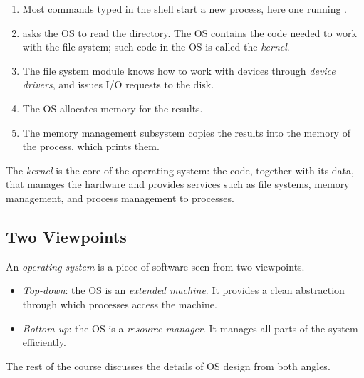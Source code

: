 \begin{enumerate}
  \item Most commands typed in the shell start a new process, here one running .
  \item {} asks the OS to read the directory. The OS contains the code needed to work with the file system; such code in the OS is called the \emph{kernel}.
  \item The file system module knows how to work with devices through \emph{device drivers}, and issues I/O requests to the disk.
  \item The OS allocates memory for the results.
  \item The memory management subsystem copies the results into the memory of the  process, which prints them.
\end{enumerate}

\begin{definition}[Kernel]
  The \emph{kernel} is the core of the operating system: the code, together with its data, that manages the hardware and provides services such as file systems, memory management, and process management to processes.
\end{definition}

\subsection{Two Viewpoints}

\begin{definition}
  An \emph{operating system} is a piece of software seen from two viewpoints.
  \begin{itemize}
    \item \emph{Top-down}: the OS is an \emph{extended machine}. It provides a clean abstraction through which processes access the machine.
    \item \emph{Bottom-up}: the OS is a \emph{resource manager}. It manages all parts of the system efficiently.
  \end{itemize}
\end{definition}

The rest of the course discusses the details of OS design from both angles.
